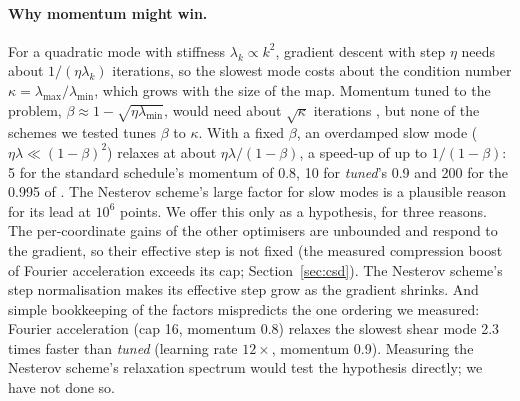 \documentclass[11pt]{article}
\begin{document}
\paragraph{Why momentum might win.} For a quadratic mode with stiffness $\lambda_k\propto k^2$, gradient descent with
step $\eta$ needs about $1/(\eta\lambda_k)$ iterations, so the slowest mode costs about the condition number
$\kappa=\lambda_{\max}/\lambda_{\min}$, which grows with the size of the map. Momentum tuned to the problem,
$\beta\approx1-\sqrt{\eta\lambda_{\min}}$, would need about $\sqrt\kappa$ iterations \citep{polyak1964,nesterov1983},
but none of the schemes we tested tunes $\beta$ to $\kappa$. With a fixed $\beta$, an overdamped slow mode
($\eta\lambda\ll(1-\beta)^2$) relaxes at about $\eta\lambda/(1-\beta)$, a speed-up of up to $1/(1-\beta)$: 5 for the
standard schedule's momentum of 0.8, 10 for \emph{tuned}'s 0.9 and 200 for the 0.995 of \citet{lambert2023nesterov}.
The Nesterov scheme's large factor for slow modes is a plausible reason for its lead at $10^6$ points. We offer this
only as a hypothesis, for three reasons. The per-coordinate gains of the other optimisers are unbounded and respond to
the gradient, so their effective step is not fixed (the measured compression boost of Fourier acceleration exceeds
its cap; Section~\ref{sec:csd}). The Nesterov scheme's step normalisation makes its effective step grow as the
gradient shrinks. And simple bookkeeping of the factors mispredicts the one ordering we measured: Fourier acceleration
(cap 16, momentum 0.8) relaxes the slowest shear mode 2.3 times faster than \emph{tuned} (learning rate $12\times$,
momentum 0.9). Measuring the Nesterov scheme's relaxation spectrum would test the hypothesis directly; we have not
done so.
\end{document}
